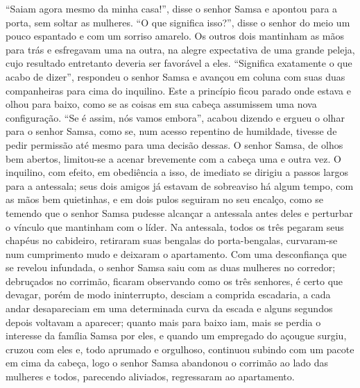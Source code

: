 “Saiam agora mesmo da minha casa!”, disse o senhor Samsa e apontou para a
porta, sem soltar as mulheres. “O que significa isso?”, disse o senhor do
meio um pouco espantado e com um sorriso amarelo. Os outros dois mantinham
as mãos para trás e esfregavam uma na outra, na alegre expectativa de uma
grande peleja, cujo resultado entretanto deveria ser favorável a eles.
“Significa exatamente o que acabo de dizer”, respondeu o senhor Samsa e
avançou em coluna com suas duas companheiras para cima do inquilino. Este
a princípio ficou parado onde estava e olhou para baixo, como se as coisas
em sua cabeça assumissem uma nova configuração. “Se é assim, nós vamos
embora”, acabou dizendo e ergueu o olhar para o senhor Samsa, como se, num
acesso repentino de humildade, tivesse de pedir permissão até mesmo para
uma decisão dessas. O senhor Samsa, de olhos bem abertos, limitou-se a
acenar brevemente com a cabeça uma e outra vez. O inquilino, com efeito,
em obediência a isso, de imediato se dirigiu a passos largos para a
antessala; seus dois amigos já estavam de sobreaviso há algum tempo, com
as mãos bem quietinhas, e em dois pulos seguiram no seu encalço, como se
temendo que o senhor Samsa pudesse alcançar a antessala antes deles e
perturbar o vínculo que mantinham com o líder. Na antessala, todos os três
pegaram seus chapéus no cabideiro, retiraram suas bengalas do
porta-bengalas, curvaram-se num cumprimento mudo e deixaram o apartamento.
Com uma desconfiança que se revelou infundada, o senhor Samsa saiu com as
duas mulheres no corredor; debruçados no corrimão, ficaram observando como
os três senhores, é certo que devagar, porém de modo ininterrupto, desciam
a comprida escadaria, a cada andar desapareciam em uma determinada curva
da escada e alguns segundos depois voltavam a aparecer; quanto mais para
baixo iam, mais se perdia o interesse da família Samsa por eles, e quando
um empregado do açougue surgiu, cruzou com eles e, todo aprumado e
orgulhoso, continuou subindo com um pacote em cima da cabeça, logo o
senhor Samsa abandonou o corrimão ao lado das mulheres e todos, parecendo
aliviados, regressaram ao apartamento.

